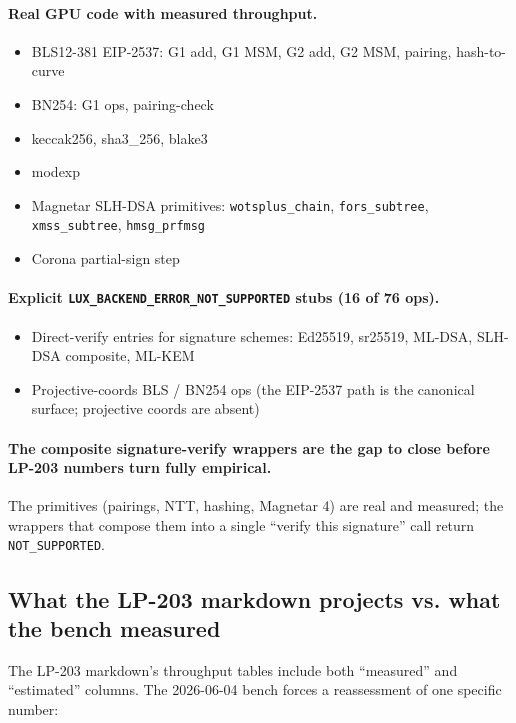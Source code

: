 \paragraph{Real GPU code with measured throughput.}
\begin{itemize}[leftmargin=2em,nosep]
\item BLS12-381 EIP-2537: G1 add, G1 MSM, G2 add, G2 MSM,
  pairing, hash-to-curve
\item BN254: G1 ops, pairing-check
\item keccak256, sha3\_256, blake3
\item modexp
\item Magnetar SLH-DSA primitives: \texttt{wotsplus\_chain},
  \texttt{fors\_subtree}, \texttt{xmss\_subtree},
  \texttt{hmsg\_prfmsg}
\item Corona partial-sign step
\end{itemize}

\paragraph{Explicit \texttt{LUX\_BACKEND\_ERROR\_NOT\_SUPPORTED}
stubs (16 of 76 ops).}
\begin{itemize}[leftmargin=2em,nosep]
\item Direct-verify entries for signature schemes: Ed25519,
  sr25519, ML-DSA, SLH-DSA composite, ML-KEM
\item Projective-coords BLS / BN254 ops (the EIP-2537 path is
  the canonical surface; projective coords are absent)
\end{itemize}

\paragraph{The composite signature-verify wrappers are the gap
to close before LP-203 numbers turn fully empirical.} The
primitives (pairings, NTT, hashing, Magnetar 4) are real and
measured; the wrappers that compose them into a single
``verify this signature'' call return \texttt{NOT\_SUPPORTED}.

\subsection{What the LP-203 markdown projects vs. what the
bench measured}

The LP-203 markdown's throughput tables include both
``measured'' and ``estimated'' columns. The 2026-06-04 bench
forces a reassessment of one specific number:

